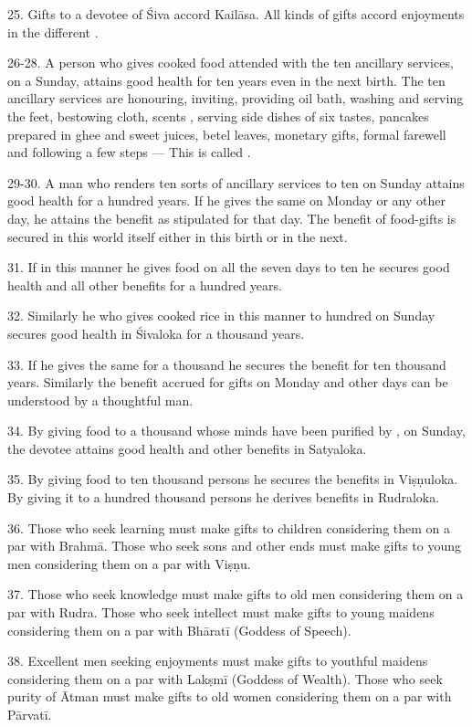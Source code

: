25. Gifts to a  devotee of Śiva accord Kailāsa. All kinds of gifts
accord enjoyments in the different .

26-28. A person who gives cooked food attended with the ten ancillary services,
on a Sunday, attains good health for ten years even in the next birth. The ten
ancillary services are honouring, inviting, providing oil bath, washing and
serving the feet, bestowing cloth, scents \etc, serving side dishes of six
tastes, pancakes prepared in ghee and sweet juices, betel leaves, monetary gifts,
formal farewell and following a few steps — This is called .

29-30. A man who renders ten sorts of ancillary services to ten 
on Sunday attains good health for a hundred years. If he gives the same on
Monday or any other day, he attains the benefit as stipulated for that day.
The benefit of food-gifts is secured in this world itself either in this birth
or in the next.

31. If in this manner he gives food on all the seven days to ten 
he secures good health and all other benefits for a hundred years.

32. Similarly he who gives cooked rice in this manner to hundred 
on Sunday secures good health in Śivaloka for a thousand years.

33. If he gives the same for a thousand  he secures the benefit
for ten thousand years. Similarly the benefit accrued for gifts on Monday and
other days can be understood by a thoughtful man.

34. By giving food to a thousand  whose minds have been purified
by , on Sunday, the devotee attains good health and other benefits
in Satyaloka.

35. By giving food to ten thousand persons he secures the benefits in Viṣṇuloka.
By giving it to a hundred thousand persons he derives benefits in Rudraloka.

36. Those who seek learning must make gifts to children considering them on
a par with Brahmā. Those who seek sons and other ends must make gifts to young
men considering them on a par with Viṣṇu.

37. Those who seek knowledge must make gifts to old men considering them on
a par with Rudra. Those who seek intellect must make gifts to young maidens
considering them on a par with Bhāratī (Goddess of Speech).

38. Excellent men seeking enjoyments must make gifts to youthful maidens
considering them on a par with Lakṣmī (Goddess of Wealth). Those who seek purity
of Ātman must make gifts to old women considering them on a par with Pārvatī.

